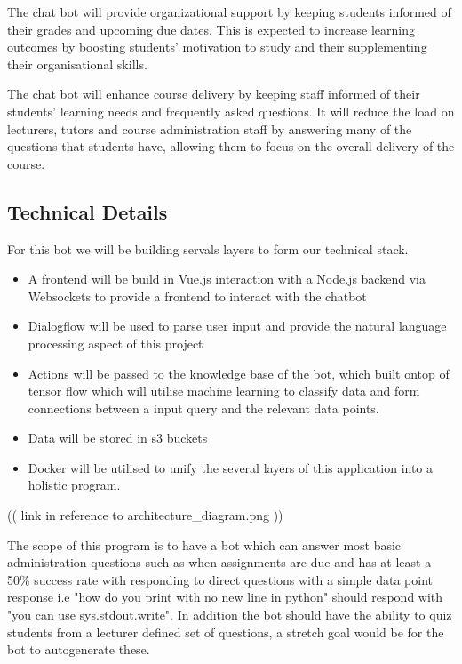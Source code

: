 \documentclass{article}
\begin{document}
The chat bot will provide organizational support by keeping students informed of their grades and upcoming due dates. This is expected to increase learning outcomes by boosting students' motivation to study and their supplementing their organisational skills.

The chat bot will enhance course delivery by keeping staff informed of their students' learning needs and frequently asked questions. It will reduce the load on lecturers, tutors and course administration staff by answering many of the questions that students have, allowing them to focus on the overall delivery of the course. 


\subsection{Technical Details}

For this bot we will be building servals layers to form our technical stack.

\begin{itemize}
  \item A frontend will be build in Vue.js interaction with a Node.js backend via Websockets to provide a frontend to interact with the chatbot
  \item Dialogflow will be used to parse user input and provide the natural language processing aspect of this project
  \item Actions will be passed to the knowledge base of the bot, which built ontop of tensor flow which will utilise machine learning to classify data and form connections between a input query and the relevant data points.
  \item Data will be stored in s3 buckets
  \item Docker will be utilised to unify the several layers of this application into a holistic program. 
\end{itemize}

(( link in reference to architecture_diagram.png ))

The scope of this program is to have a bot which can answer most basic administration questions such as when assignments are due and has at least a 50\% success rate with responding to direct questions with a simple data point response i.e 
"how do you print with no new line in python" should respond with "you can use sys.stdout.write". In addition the bot should have the ability to quiz students from a lecturer defined set of questions, a stretch goal would be for the bot to autogenerate these.
\end{document}
